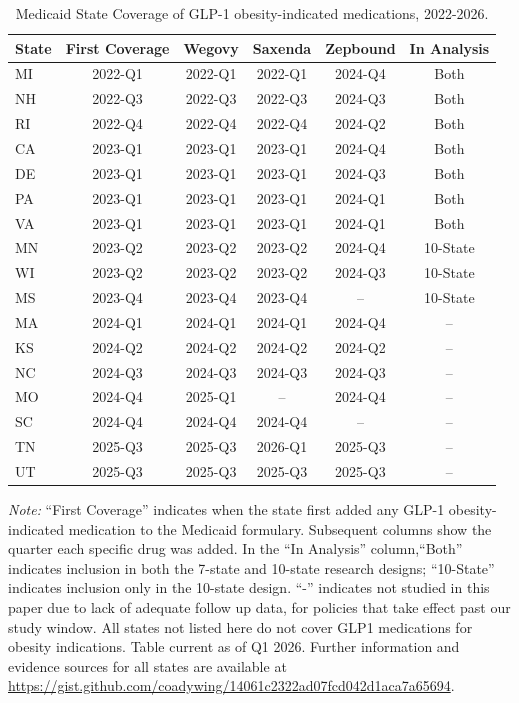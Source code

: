 \begin{table}[!htbp]
  \centering
  \caption{Medicaid State Coverage of GLP-1 obesity-indicated medications, 2022-2026.}
  \small
  \begin{tabular}{lccccc}
    \toprule
    State & First Coverage & Wegovy & Saxenda & Zepbound & In Analysis \\
    \midrule
    MI & 2022-Q1 & 2022-Q1 & 2022-Q1 & 2024-Q4 & Both \\
    NH & 2022-Q3 & 2022-Q3 & 2022-Q3 & 2024-Q3 & Both \\
    RI & 2022-Q4 & 2022-Q4 & 2022-Q4 & 2024-Q2 & Both \\
    CA & 2023-Q1 & 2023-Q1 & 2023-Q1 & 2024-Q4 & Both \\
    DE & 2023-Q1 & 2023-Q1 & 2023-Q1 & 2024-Q3 & Both \\
    PA & 2023-Q1 & 2023-Q1 & 2023-Q1 & 2024-Q1 & Both \\
    VA & 2023-Q1 & 2023-Q1 & 2023-Q1 & 2024-Q1 & Both \\
    MN & 2023-Q2 & 2023-Q2 & 2023-Q2 & 2024-Q4 & 10-State \\
    WI & 2023-Q2 & 2023-Q2 & 2023-Q2 & 2024-Q3 & 10-State \\
    MS & 2023-Q4 & 2023-Q4 & 2023-Q4 & -- & 10-State \\
    MA & 2024-Q1 & 2024-Q1 & 2024-Q1 & 2024-Q4 & -- \\
    KS & 2024-Q2 & 2024-Q2 & 2024-Q2 & 2024-Q2 & -- \\
    NC & 2024-Q3 & 2024-Q3 & 2024-Q3 & 2024-Q3 & -- \\
    MO & 2024-Q4 & 2025-Q1 & -- & 2024-Q4 & -- \\
    SC & 2024-Q4 & 2024-Q4 & 2024-Q4 & -- & -- \\
    TN & 2025-Q3 & 2025-Q3 & 2026-Q1 & 2025-Q3 & -- \\
    UT & 2025-Q3 & 2025-Q3 & 2025-Q3 & 2025-Q3 & -- \\
    \bottomrule
  \end{tabular}
  \begin{minipage}{0.95\textwidth}
    \vspace{0.5em}
    \footnotesize \textit{Note:} ``First Coverage'' indicates when the state first added any GLP-1 obesity-indicated medication to the Medicaid formulary. Subsequent columns show the quarter each specific drug was added. In the ``In Analysis'' column,``Both'' indicates inclusion in both the 7-state and 10-state research designs; ``10-State'' indicates inclusion only in the 10-state design. ``-'' indicates not studied in this paper due to lack of adequate follow up data, for policies that take effect past our study window. All states not listed here do not cover GLP1 medications for obesity indications. Table current as of Q1 2026. Further information and evidence sources for all states are available at \url{https://gist.github.com/coadywing/14061c2322ad07fcd042d1aca7a65694}.
  \end{minipage}
  \label{tab:coverage_details}
\end{table}
